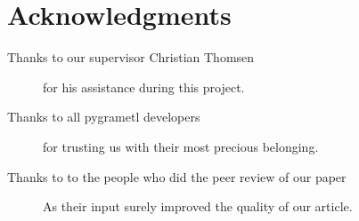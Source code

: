 \section*{Acknowledgments} %


\begin{description}
\item[Thanks to our supervisor Christian Thomsen] for his assistance during this project. 
\item[Thanks to all pygrametl developers] for trusting us with their most precious belonging. 
\item[Thanks to to the people who did the peer review of our paper] As their input surely improved the quality of our article. 
\end{description}